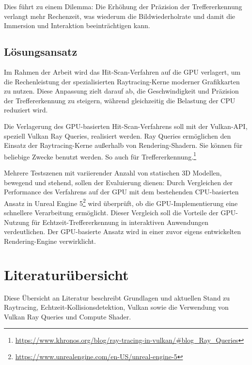\documentclass[11pt]{scrartcl}
\begin{document}
	Dies führt zu einem Dilemma: Die Erhöhung der Präzision der Treffererkennung verlangt mehr Rechenzeit, was wiederum die Bildwiederholrate und damit die Immersion und Interaktion beeinträchtigen kann.

	
	\subsection{Lösungsansatz}
		
	Im Rahmen der Arbeit wird das Hit-Scan-Verfahren auf die GPU verlagert, um die Rechenleistung der spezialisierten Raytracing-Kerne moderner Grafikkarten zu nutzen. Diese Anpassung zielt darauf ab, die Geschwindigkeit und Präzision der Treffererkennung zu steigern, während gleichzeitig die Belastung der CPU reduziert wird.
	
	Die Verlagerung des GPU-basierten Hit-Scan-Verfahrens soll mit der Vulkan-API, speziell Vulkan Ray Queries, realisiert werden. Ray Queries ermöglichen den Einsatz der Raytracing-Kerne außerhalb von Rendering-Shadern. Sie können für beliebige Zwecke benutzt werden. So auch für Treffererkennung.\footnote{\url{https://www.khronos.org/blog/ray-tracing-in-vulkan/\#blog\_Ray\_Queries}}
	
	Mehrere Testszenen mit variierender Anzahl von statischen 3D Modellen, bewegend und stehend, sollen der Evaluierung dienen: Durch Vergleichen der Performance des Verfahrens auf der GPU mit dem bestehenden CPU-basierten Ansatz in Unreal Engine 5\footnote{\url{https://www.unrealengine.com/en-US/unreal-engine-5}} wird überprüft, ob die GPU-Implementierung eine schnellere Verarbeitung ermöglicht. Dieser Vergleich soll die Vorteile der GPU-Nutzung für Echtzeit-Treffererkennung in interaktiven Anwendungen verdeutlichen. Der GPU-basierte Ansatz wird in einer zuvor eigens entwickelten Rendering-Engine verwirklicht.

	\pagebreak
	
	\section{Literaturübersicht}
	
	Diese Übersicht an Literatur beschreibt Grundlagen und aktuellen Stand zu Raytracing, Echtzeit-Kollisionsdetektion, Vulkan sowie die Verwendung von Vulkan Ray Queries und Compute Shader. 
	
\end{document}
